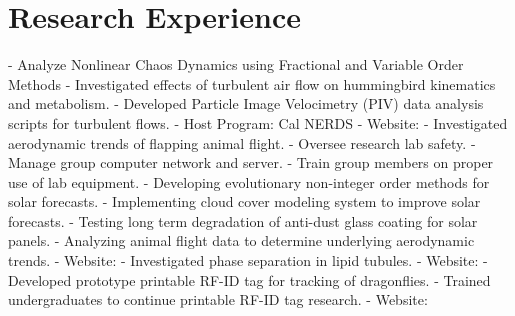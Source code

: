 \documentclass[11pt,a4paper]{moderncv}
\begin{document}
\section{\textbf{Research Experience}} 
%
	{
	- Analyze Nonlinear Chaos Dynamics using Fractional and Variable Order Methods
	}
	{
	- Investigated effects of turbulent air flow on hummingbird kinematics and metabolism. \newline
	- Developed Particle Image Velocimetry (PIV) data analysis scripts for turbulent flows. \newline
    	- Host Program: Cal NERDS \newline
    	- Website: \color{web}{http://ib.berkeley.edu/labs/dudley/}
    	}
	{
	- Investigated aerodynamic trends of flapping animal flight.
	}
	{
	- Oversee research lab safety. \newline
	- Manage group computer network and server. \newline
	- Train group members on proper use of lab equipment.
	}
	{
	- Developing evolutionary non-integer order methods for solar forecasts. \newline
	- Implementing cloud cover modeling system to improve solar forecasts. \newline
	- Testing long term degradation of anti-dust glass coating for solar panels. \newline
	- Analyzing animal flight data to determine underlying aerodynamic trends. \newline
	- Website: {\color{web}{http://sol.ucmerced.edu/}}
	}
	{
	- Investigated phase separation in lipid tubules. \newline
	- Website: {\color{web}{http://faculty.ucmerced.edu/lhirst/}}
	}
	{
	- Developed prototype printable RF-ID tag for tracking of dragonflies. \newline
	- Trained undergraduates to continue printable RF-ID tag research. \newline
	- Website: {\color{web}{http://mems.soe.ucsc.edu/}}
	}
\end{document}
